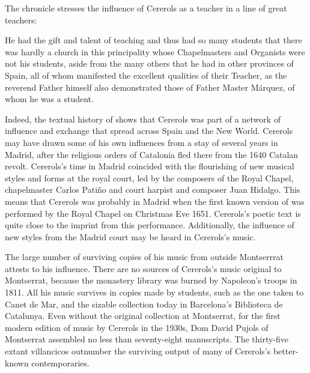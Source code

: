 The chronicle stresses the influence of Cererols as a teacher in a line of great
teachers:
\begin{quoting}
    He had the gift and talent of teaching and thus had so many students that
    there was hardly a church in this principality  whose
    Chapelmasters and Organists were not his students, aside from the many
    others that he had in other provinces of Spain, all of whom manifested the
    excellent qualities of their Teacher, as the reverend Father himself also
    demonstrated those of Father Master Márquez, of whom he  was a
    student.%
    \Autocite[7, note 2]{Estrada:CererolsBio}
\end{quoting}
Indeed, the textual history of  shows that Cererols
was part of a network of influence and exchange that spread across Spain and
the New World. 
Cererols may have drawn some of his own influences from a stay of several years
in Madrid, after the religious orders of Catalonia fled there from the 1640
Catalan revolt.
Cererols's time in Madrid coincided with the flourishing of new musical styles
and forms at the royal court, led by the composers of the Royal Chapel,
chapelmaster Carlos Patiño and court harpist and composer Juan Hidalgo.%
    \Autocites
    {Stein:Songs}
    {Rodriguez:Villancico}
This means that Cererols was probably in Madrid when the first known version of
 was performed by the Royal Chapel on Christmas Eve
1651.
Cererols's poetic text is quite close to the imprint from this performance.
Additionally, the influence of new styles from the Madrid court may be heard in
Cererols's music.


The large number of surviving copies of his music from outside Montserrrat
attests to his influence.
There are no sources of Cererols's music original to Montserrat, because the
monastery library was burned by Napoleon's troops in 1811.
All his music survives in copies made by students, such as the one taken to
Canet de Mar, and the sizable collection today in Barcelona's Biblioteca de
Catalunya.
Even without the original collection at Montserrat, for the first modern edition
of music by Cererols in the 1930s, Dom David Pujols of Montserrat assembled no
less than seventy-eight manuscripts.%
    \Autocite{Cererols:MEM-VC}
The thirty-five extant villancicos outnumber the surviving output of many of
Cererols's better-known contemporaries.

